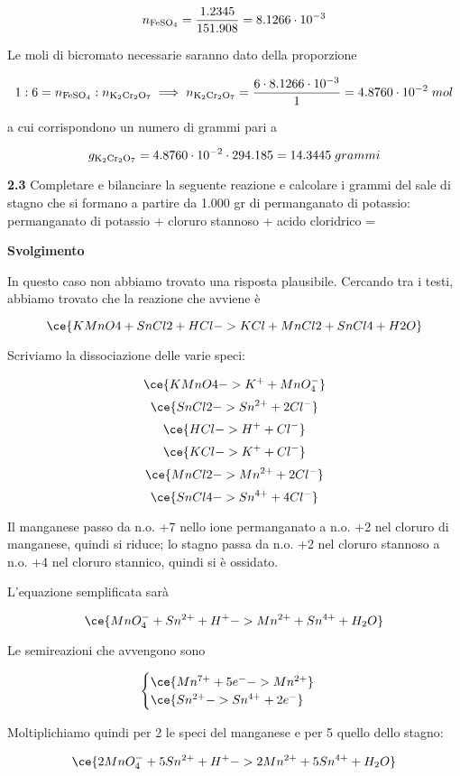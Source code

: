 $$n_{\rm FeSO_4}=\frac{1.2345}{151.908}=8.1266 \cdot 10^{-3}$$

Le moli di bicromato necessarie saranno dato della proporzione

$$1:6=n_{\rm FeSO_4}:n_{\rm K_2Cr_2O_7}
\implies
n_{\rm K_2Cr_2O_7}
=\frac{6 \cdot 8.1266 \cdot 10^{-3}}{1}
=4.8760 \cdot 10^{-2}\;mol$$

a cui corrispondono un numero di grammi pari a

$$g_{\rm K_2Cr_2O_7}
=4.8760 \cdot 10^{-2} \cdot 294.185
=14.3445\;grammi$$

\vspace{0.2cm}\textbf{2.3} Completare e bilanciare la seguente reazione e calcolare i grammi del sale di stagno che si formano a partire da 1.000 gr di permanganato di potassio: 
permanganato di potassio + cloruro stannoso + acido cloridrico =

\vspace{0.2cm}\large\textbf{Svolgimento}\normalsize

\vspace{0.2cm}In questo caso non abbiamo trovato una risposta plausibile. Cercando tra i testi, abbiamo trovato che la reazione che avviene è

$$\ce{KMnO4 + SnCl2 + HCl -> KCl + MnCl2 + SnCl4 + H2O}$$

Scriviamo la dissociazione delle varie speci:

$$\ce{KMnO4 -> K^+ + MnO_4^-}$$
$$\ce{SnCl2 -> Sn^{2+} + 2Cl^-}$$
$$\ce{HCl -> H^+ + Cl^-}$$
$$\ce{KCl -> K^+ + Cl^-}$$
$$\ce{MnCl2 -> Mn^{2+} + 2Cl^-}$$
$$\ce{SnCl4 -> Sn^{4+} + 4Cl^-}$$

Il manganese passo da n.o. +7 nello ione permanganato a n.o. +2 nel cloruro di
manganese, quindi si riduce; lo stagno passa da n.o. +2 nel cloruro stannoso a n.o. +4 nel cloruro stannico, quindi si è ossidato.

L'equazione semplificata sarà

$$\ce{MnO_4^- + Sn^{2+} + H^+ -> Mn^{2+} + Sn^{4+} + H_2O}$$

Le semireazioni che avvengono sono

$$\begin{cases}
    \ce{Mn^{7+} + 5e^- -> Mn^{2+}}\\
    \ce{Sn^{2+} -> Sn^{4+} + 2e^-}
\end{cases}$$

Moltiplichiamo quindi per 2 le speci del manganese e per 5 quello dello stagno:

$$\ce{2MnO_4^- + 5Sn^{2+} + H^+ -> 2Mn^{2+} + 5Sn^{4+} + H_2O}$$

